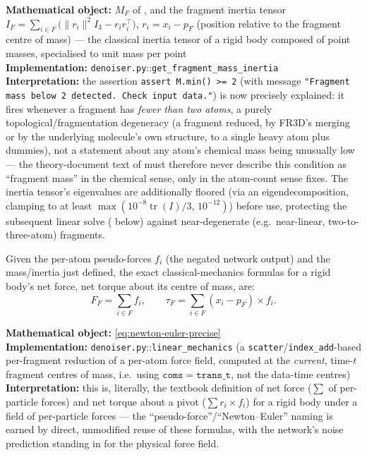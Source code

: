 \documentclass[11pt,a4paper]{report}
\theoremstyle{definition}
\theoremstyle{remark}
\DeclareMathOperator{\tr}{tr}
\newcommand{\file}[1]{\texttt{#1}}
\newcommand{\pyfunc}[1]{\texttt{#1}}
\begin{document}
\begin{codebox}
\textbf{Mathematical object:} $M_F$ of , and
the fragment inertia tensor
$I_F=\sum_{i\in F}\bigl(\|r_i\|^2I_3 - r_ir_i^\top\bigr)$, $r_i=x_i-p_F$
(position relative to the fragment centre of mass) --- the classical
inertia tensor of a rigid body composed of point masses, specialised to
unit mass per point \\
\textbf{Implementation:} \file{denoiser.py}::\pyfunc{get\_fragment\_mass\_inertia} \\
\textbf{Interpretation:} the assertion \texttt{assert M.min() >= 2} (with
message \texttt{"Fragment mass below 2 detected. Check input data."}) is
now precisely explained: it fires whenever a fragment has \emph{fewer than
two atoms}, a purely topological/fragmentation degeneracy (a fragment
reduced, by FR3D's merging or by the underlying molecule's own structure,
to a single heavy atom plus dummies), not a statement about any atom's
chemical mass being unusually low --- the theory-document text of
 must therefore never describe this condition as
``fragment mass'' in the chemical sense, only in the atom-count sense
 fixes. The inertia tensor's eigenvalues
are additionally floored (via an eigendecomposition, clamping to at least
$\max(10^{-8}\tr(I)/3,\,10^{-12})$) before use, protecting the subsequent
linear solve ( below) against
near-degenerate (e.g.\ near-linear, two-to-three-atom) fragments.
\end{codebox}

Given the per-atom pseudo-forces $f_i$ (the negated network output) and the
mass/inertia just defined, the exact classical-mechanics formulas for a
rigid body's net force, net torque about its centre of mass, are:
\begin{equation}
\label{eq:newton-euler-precise}
F_F = \sum_{i\in F}f_i,
\qquad
\tau_F = \sum_{i\in F}(x_i-p_F)\times f_i .
\end{equation}

\begin{codebox}
\textbf{Mathematical object:} \eqref{eq:newton-euler-precise} \\
\textbf{Implementation:} \file{denoiser.py}::\pyfunc{linear\_mechanics}
(a \texttt{scatter}/\texttt{index\_add}-based per-fragment reduction of a
per-atom force field, computed at the \emph{current}, time-$t$ fragment
centres of mass, i.e.\ using $\mathtt{coms}=\mathtt{trans\_t}$, not the
data-time centres) \\
\textbf{Interpretation:} this is, literally, the textbook definition of net
force ($\sum$ of per-particle forces) and net torque about a pivot
($\sum r_i\times f_i$) for a rigid body under a field of per-particle
forces --- the ``pseudo-force''/``Newton--Euler'' naming is earned by
direct, unmodified reuse of these formulas, with the network's noise
prediction standing in for the physical force field.
\end{codebox}
\end{document}
